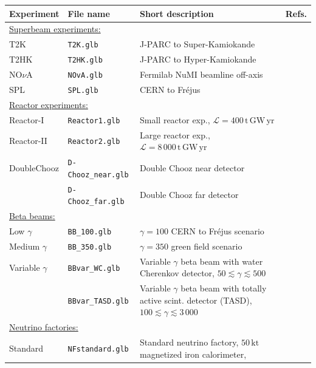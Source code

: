 \documentclass[12pt,a4paper]{article}
\newcommand{\Refs}{Refs.}
\begin{document}
\begin{table}[t!]
{\small
\begin{center}
\begin{tabular}{llp{7.0cm}c}
\hline
Experiment & File name & Short description &  \Refs \\
\hline 
\multicolumn{4}{l}{\underline{Superbeam experiments:}} \\
T2K & {\tt T2K.glb} & J-PARC to Super-Kamiokande &  \cite{Itow:2001ee,Huber:2002mx} \\
T2HK & {\tt T2HK.glb} & J-PARC to Hyper-Kamiokande &  \cite{Itow:2001ee,Huber:2002mx} \\
NO$\nu$A & {\tt NOvA.glb} & Fermilab NuMI beamline off-axis  & \cite{Ambats:2004js,Yang_2004} \\
SPL & {\tt SPL.glb} & CERN to Fr\'{e}jus & \cite{Campagne:2006yx,Campagne:2004wt,Mezzetto:2003mm} \\[0.2cm]
\multicolumn{4}{l}{\underline{Reactor experiments:}} \\
{\sc Reactor-I} & {\tt Reactor1.glb} & Small reactor exp., 
$\mathcal{L} = 400 \, \mathrm{t} \, \mathrm{GW} \, \mathrm{yr}$
& \cite{Huber:2003pm} \\
{\sc Reactor-II} & {\tt Reactor2.glb} & Large reactor exp., 
$\mathcal{L} = 8\, 000 \, \mathrm{t} \, \mathrm{GW} \, \mathrm{yr}$ 
& \cite{Huber:2003pm} \\
Double{\sc Chooz} & {\tt D-Chooz\_near.glb} & Double Chooz near 
detector & \cite{Huber:2006vr} \\ 
 & {\tt D-Chooz\_far.glb} & Double Chooz far detector & \\[0.2cm]
\multicolumn{4}{l}{\underline{Beta beams:}} \\
Low $\gamma$ & {\tt BB\_100.glb} & $\gamma=100$ CERN to Fr\'{e}jus 
scenario & \cite{Campagne:2006yx} \\
Medium $\gamma$ & {\tt BB\_350.glb} & $\gamma=350$ green field scenario 
& \cite{Burguet-Castell:2005pa} \\
Variable $\gamma$ & {\tt BBvar\_WC.glb} & Variable $\gamma$ beta beam with water Cherenkov detector, $50 \lesssim \gamma \lesssim 500$ & \cite{Huber:2005jk} \\[0.2cm]
	& {\tt BBvar\_TASD.glb} & Variable $\gamma$ beta beam with totally active scint. detector (TASD), 
$100 \lesssim \gamma \lesssim 3\, 000$ & \cite{Huber:2005jk} \\[0.4cm]
\multicolumn{4}{l}{\underline{Neutrino factories:}} \\
Standard & {\tt NFstandard.glb} & Standard neutrino factory, $50 \, \mathrm{kt}$ magnetized iron calorimeter, 

\end{tabular}
\end{center}}
\end{table}
\end{document}
